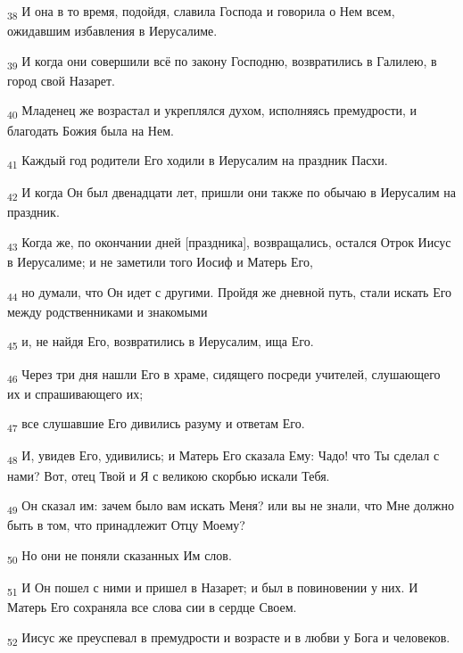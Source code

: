 \begin{tcolorbox}
\textsubscript{38} И она в то время, подойдя, славила Господа и говорила о Нем всем, ожидавшим избавления в Иерусалиме.
\end{tcolorbox}
\begin{tcolorbox}
\textsubscript{39} И когда они совершили всё по закону Господню, возвратились в Галилею, в город свой Назарет.
\end{tcolorbox}
\begin{tcolorbox}
\textsubscript{40} Младенец же возрастал и укреплялся духом, исполняясь премудрости, и благодать Божия была на Нем.
\end{tcolorbox}
\begin{tcolorbox}
\textsubscript{41} Каждый год родители Его ходили в Иерусалим на праздник Пасхи.
\end{tcolorbox}
\begin{tcolorbox}
\textsubscript{42} И когда Он был двенадцати лет, пришли они также по обычаю в Иерусалим на праздник.
\end{tcolorbox}
\begin{tcolorbox}
\textsubscript{43} Когда же, по окончании дней [праздника], возвращались, остался Отрок Иисус в Иерусалиме; и не заметили того Иосиф и Матерь Его,
\end{tcolorbox}
\begin{tcolorbox}
\textsubscript{44} но думали, что Он идет с другими. Пройдя же дневной путь, стали искать Его между родственниками и знакомыми
\end{tcolorbox}
\begin{tcolorbox}
\textsubscript{45} и, не найдя Его, возвратились в Иерусалим, ища Его.
\end{tcolorbox}
\begin{tcolorbox}
\textsubscript{46} Через три дня нашли Его в храме, сидящего посреди учителей, слушающего их и спрашивающего их;
\end{tcolorbox}
\begin{tcolorbox}
\textsubscript{47} все слушавшие Его дивились разуму и ответам Его.
\end{tcolorbox}
\begin{tcolorbox}
\textsubscript{48} И, увидев Его, удивились; и Матерь Его сказала Ему: Чадо! что Ты сделал с нами? Вот, отец Твой и Я с великою скорбью искали Тебя.
\end{tcolorbox}
\begin{tcolorbox}
\textsubscript{49} Он сказал им: зачем было вам искать Меня? или вы не знали, что Мне должно быть в том, что принадлежит Отцу Моему?
\end{tcolorbox}
\begin{tcolorbox}
\textsubscript{50} Но они не поняли сказанных Им слов.
\end{tcolorbox}
\begin{tcolorbox}
\textsubscript{51} И Он пошел с ними и пришел в Назарет; и был в повиновении у них. И Матерь Его сохраняла все слова сии в сердце Своем.
\end{tcolorbox}
\begin{tcolorbox}
\textsubscript{52} Иисус же преуспевал в премудрости и возрасте и в любви у Бога и человеков.
\end{tcolorbox}

